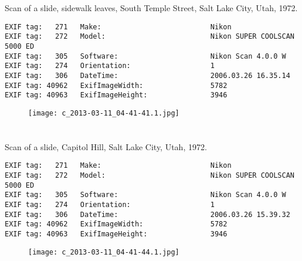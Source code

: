 \clearpage
\section{\protect{}}
\noindent Scan of a slide, sidewalk leaves, South Temple Street, Salt Lake City, Utah, 1972.
\noindent
\begin{lstlisting}
EXIF tag:   271   Make:                          Nikon
EXIF tag:   272   Model:                         Nikon SUPER COOLSCAN 5000 ED
EXIF tag:   305   Software:                      Nikon Scan 4.0.0 W
EXIF tag:   274   Orientation:                   1
EXIF tag:   306   DateTime:                      2006.03.26 16.35.14
EXIF tag: 40962   ExifImageWidth:                5782
EXIF tag: 40963   ExifImageHeight:               3946

\end{lstlisting}
\clearpage
\begin{figure}
\raggedleft
\texttt{[image: c\_2013-03-11\_04-41-41.1.jpg]}
\end{figure}


\clearpage
\section{\protect{}}
\noindent Scan of a slide, Capitol Hill, Salt Lake City, Utah, 1972.
\noindent
\begin{lstlisting}
EXIF tag:   271   Make:                          Nikon
EXIF tag:   272   Model:                         Nikon SUPER COOLSCAN 5000 ED
EXIF tag:   305   Software:                      Nikon Scan 4.0.0 W
EXIF tag:   274   Orientation:                   1
EXIF tag:   306   DateTime:                      2006.03.26 15.39.32
EXIF tag: 40962   ExifImageWidth:                5782
EXIF tag: 40963   ExifImageHeight:               3946

\end{lstlisting}
\clearpage
\begin{figure}
\raggedleft
\texttt{[image: c\_2013-03-11\_04-41-44.1.jpg]}
\end{figure}


\clearpage
